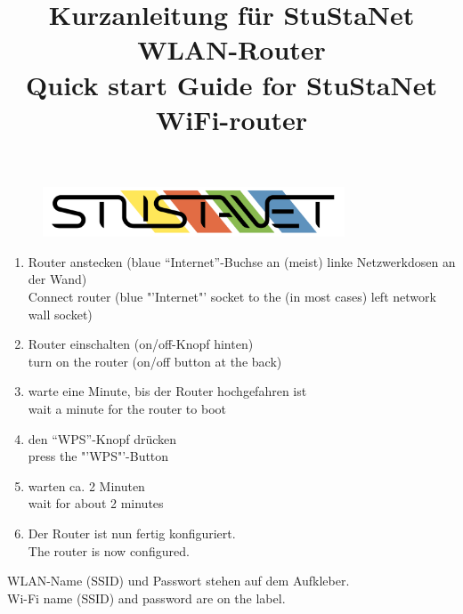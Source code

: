 \documentclass[a4paper,11pt]{scrartcl}
\title{Kurzanleitung für StuStaNet WLAN-Router\\Quick start Guide for StuStaNet WiFi-router}
\date{}
\begin{document}
	
\maketitle

\begin{figure}[t!]
	\centering
	\vspace{-20pt}
	\includegraphics[width=0.8\textwidth,keepaspectratio]{Bilder/StuStaNet_Logo}
	\vspace{-50pt}
\end{figure}

\vspace{-70pt}


\begin{enumerate}
	\item Router anstecken (blaue "`Internet"'-Buchse an (meist) linke Netzwerkdosen an der Wand)\\
	Connect router (blue "'Internet"' socket to the (in most cases) left network wall socket)
	\item Router einschalten (on/off-Knopf hinten)\\
	turn on the router (on/off button at the back)
	\item warte eine Minute, bis der Router hochgefahren ist\\
	wait a minute for the router to boot
	\item den "`WPS"'-Knopf drücken\\
	press the "'WPS"'-Button
	\item warten ca. 2 Minuten\\
	wait for about 2 minutes
	\item Der Router ist nun fertig konfiguriert.\\
	The router is now configured.\vspace{5 mm}
\end{enumerate}

WLAN-Name (SSID) und Passwort stehen auf dem Aufkleber.\\
Wi-Fi name (SSID) and password are on the label.\vspace{5 mm}
\end{document}
